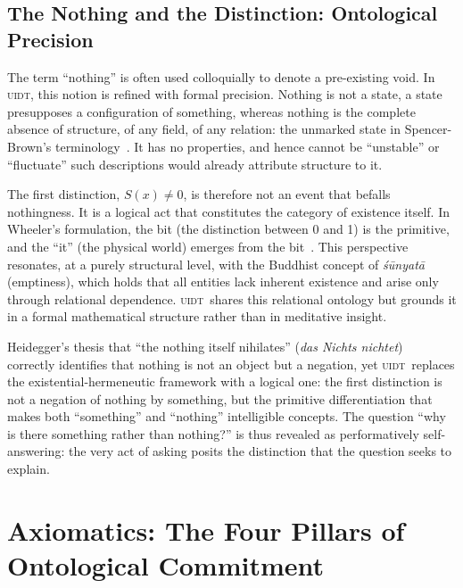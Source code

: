 \documentclass[12pt,a4paper,twoside]{article}
\theoremstyle{plain}
\theoremstyle{definition}
\theoremstyle{remark}
\newcommand{\UIDT}{\textsc{uidt}}
\begin{document}
\subsection{The Nothing and the Distinction: Ontological Precision}
\label{subsec:nothing}

The term ``nothing'' is often used colloquially to denote a pre-existing void.
In \UIDT, this notion is refined with formal precision. Nothing is not a state,
a state presupposes a configuration of something, whereas nothing is the
complete absence of structure, of any field, of any relation: the unmarked
state in Spencer-Brown's terminology~\cite{SpencerBrown1969}. It has no
properties, and hence cannot be ``unstable'' or ``fluctuate'' such
descriptions would already attribute structure to it.

The first distinction, $S(x) \neq 0$, is therefore not an event that befalls
nothingness. It is a logical act that constitutes the category of existence
itself. In Wheeler's formulation, the bit (the distinction between 0 and
1) is the primitive, and the ``it'' (the physical world) emerges from the
bit~\cite{Wheeler1990}. This perspective resonates, at a purely structural
level, with the Buddhist concept of \emph{śūnyatā} (emptiness), which holds
that all entities lack inherent existence and arise only through relational
dependence. \UIDT\ shares this relational ontology but grounds it in a formal
mathematical structure rather than in meditative insight.

Heidegger's thesis that ``the nothing itself nihilates'' (\emph{das Nichts
nichtet})~\cite{Heidegger1929} correctly identifies that nothing is not an
object but a negation, yet \UIDT\ replaces the existential-hermeneutic
framework with a logical one: the first distinction is not a negation of
nothing by something, but the primitive differentiation that makes both
``something'' and ``nothing'' intelligible concepts. The question ``why is
there something rather than nothing?'' is thus revealed as performatively
self-answering: the very act of asking posits the distinction that the question
seeks to explain.

\newpage

\section{Axiomatics: The Four Pillars of Ontological Commitment}
\label{sec:axioms}
\end{document}
